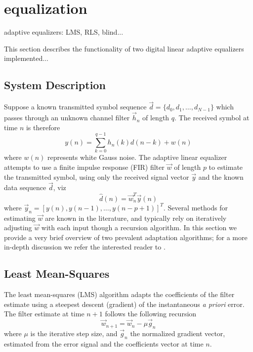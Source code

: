 % 
%

\section{equalization}
\label{module:equalization}
adaptive equalizers: LMS, RLS, blind...

This section describes the functionality of two digital linear adaptive
equalizers implemented...

\subsection{System Description}
Suppose a known transmitted symbol sequence
$\vec{d} = \{ d_0, d_1, \ldots ,d_{N-1}\}$
which passes through an unknown channel filter $\vec{h}_n$ of length $q$.
The received symbol at time $n$ is therefore
\[
    y(n) = \sum\limits_{k=0}^{q-1}{h_n(k)d(n-k)} + w(n)
\]
where $w(n)$ represents white Gauss noise.
The adaptive linear equalizer attempts to use a finite impulse response (FIR)
filter $\vec{w}$ of length $p$ to estimate the transmitted symbol, using only
the received signal vector $\vec{y}$ and the known data sequence $\vec{d}$,
viz
\[
    \hat{d}(n) = \vec{w}_n^T \vec{y}(n)
\]
where $\vec{y}_n = [ y(n), y(n-1),\ldots, y(n-p+1) ]^T$.
Several methods for estimating $\vec{w}$ are known in the literature, and
typically rely on iteratively adjusting $\vec{w}$ with each input though a
recursion algorithm.
In this section we provide a very brief overview of two prevalent adaptation
algorithms;
for a more in-depth discussion we refer the interested reader to
\cite{Proakis:2001,Haykin:2002}.

\subsection{Least Mean-Squares}
The least mean-squares (LMS) algorithm adapts the coefficients of the filter
estimate using a steepest descent (gradient) of the instantaneous {\it a priori}
error.
The filter estimate at time $n+1$ follows the following recursion
\begin{equation}
\label{eq:lms:weight_update}
\vec{w}_{n+1} = \vec{w}_{n} - \mu \vec{g}_n
\end{equation}
where $\mu$ is the iterative step size, and
$\vec{g}_n$ the normalized gradient vector, estimated from the error signal
and the coefficients vector at time $n$.

